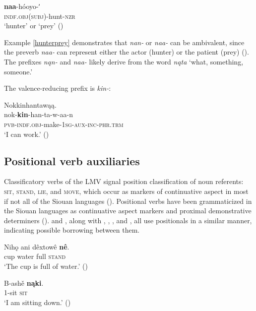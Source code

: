 \documentclass[output=paper]{LSP/langsci}
\begin{document}
\ea\label{hunterprey}
\gll	\textbf{naa}-hóoyo-ʹ~\\
		\textsc{indf.obj(subj)}-hunt-\textsc{nzr}\\
\glt	`hunter' or `prey' (\citealt[53]{Broadwell2006})
\z

Example \ref{hunterprey} demonstrates that  \emph{nan-} or \emph{naa-} can be ambivalent, since the preverb \emph{naa-} can represent either the actor (hunter) or the patient (prey) (\citealt[53]{Broadwell2006}). The  prefixes \emph{nąn-} and \emph{naa-} likely derive from the word \emph{nąta} `what, something, someone.'
 
	The  valence-reducing prefix is \emph{kin-}:
	
\ea	Nokkinhantawąą.\\
\gll		nok-\textbf{kin}-han-ta-w-aa-n\\
		\textsc{pvb-indf.obj}-make-\textsc{1sg-aux-inc-phr.trm}\\
\glt	`I can work.' (\citealt[405]{Kimball2005})
\z

\subsection{Positional verb auxiliaries}

Classificatory verbs of the LMV signal position classification of noun referents: \textsc{sit}, \textsc{stand}, \textsc{lie}, and \textsc{move}, which occur as markers of continuative aspect in most if not all of the Siouan languages (\citealt[203]{Rankin2004positionals}). Positional verbs have been grammaticized in the Siouan languages as continuative aspect markers and proximal demonstrative determiners (\citealt[116]{Mithun1999}).  and , along with , , , and , all use positionals in a similar manner, indicating possible borrowing between them. 

\ea
\settowidth{}
\gll	Nihǫ 	ani 	dêxtowê \textbf{nê}.\\
		cup water full  \textsc{stand}\\ 
\glt	`The cup is full of water.' (\citealt[166]{DorseySwanton1912})
\z
		
\ea
\settowidth{}
\gll	B-ashě \textbf{nąki}.\\
		1-sit \textsc{sit}\\ 
\glt	`I am sitting down.' (\citealt[20]{Rankin2002})
\z
\end{document}
